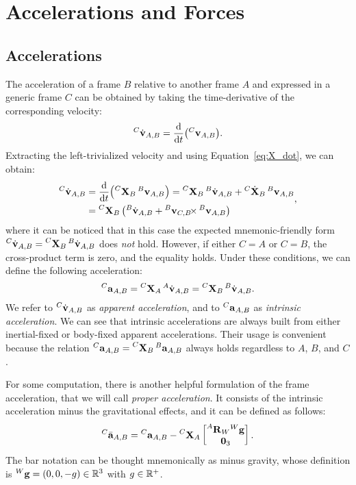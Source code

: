 \section{Accelerations and Forces}

\subsection{Accelerations}

The acceleration of a frame $B$ relative to another frame $A$ and expressed in a generic frame $C$ can be obtained by taking the time-derivative of the corresponding velocity:
%
\begin{equation*}
    \velsixd[C]_{A,B} = \dv{t}(\velsix[C]_{A,B})
    .
\end{equation*}
%
Extracting the left-trivialized velocity and using Equation~\eqref{eq:X_dot}, we can obtain:
%
\begin{equation}
    \label{eq:sixd_apparent_acceleration}
    \begin{aligned}
        \velsixd[C]_{A,B}
        &= \dv{t}(\transvel[C]_B \velsix[B]_{A,B})
        = \transvel[C]_B \velsixd[B]_{A,B} + {}^C \dot{\mathbf{X}}_B \velsix[B]_{A,B} \\
        &= \transvel[C]_B \left( \velsixd[B]_{A,B} + \crossvelsix[{\velsix[B]_{C,B}}] \velsix[B]_{A,B} \right)
    \end{aligned}
    ,
\end{equation}
%
where it can be noticed that in this case the expected mnemonic-friendly form $\velsixd[C]_{A,B} = \transvel[C]_B \velsixd[B]_{A,B}$ does \emph{not} hold.
However, if either $C=A$ or $C=B$, the cross-product term is zero, and the equality holds.
Under these conditions, we can define the following acceleration:
%
\begin{equation*}
    \label{eq:sixd_intrinsic_acceleration}
    \accsix[C]_{A,B} = \transvel[C]_A \velsixd[A]_{A,B} = \transvel[C]_B \velsixd[B]_{A,B}
    .
\end{equation*}
%
We refer to $\velsixd[C]_{A,B}$ as \emph{apparent acceleration}, and to $\accsix[C]_{A,B}$ as \emph{intrinsic acceleration}.
We can see that intrinsic accelerations are always built from either inertial-fixed or body-fixed apparent accelerations.
Their usage is convenient because the relation $\accsix[C]_{A,B} = \transvel[C]_B \accsix[B]_{A,B}$ always holds regardless to $A$, $B$, and $C$.

For some computation, there is another helpful formulation of the frame acceleration, that we will call \emph{proper acceleration}.
It consists of the intrinsic acceleration minus the gravitational effects, and it can be defined as follows:
%
\begin{equation}
    \label{eq:sixd_proper_acceleration}
    {}^C \bar{\mathbf{a}}_{A,B} = \accsix[C]_{A,B} - \transvel[C]_A
    \begin{bmatrix}
        \rot[A]_W {}^W \mathbf{g} \\ \zeros_3
    \end{bmatrix}
    .
\end{equation}
%
The bar notation can be thought mnemonically as minus gravity, whose definition is ${}^W \mathbf{g} = (0, 0, -g) \in \realn^3$ with $g \in \realn^+$.

